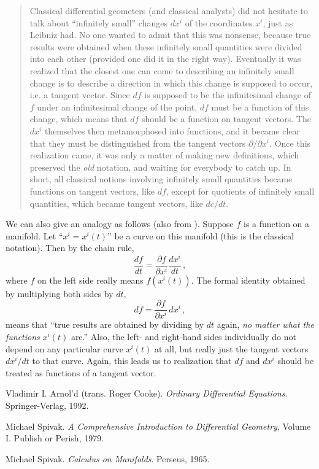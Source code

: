 \documentclass[12pt]{article}
\begin{document}
\begin{quote}
Classical differential geometers (and classical analysts)
did not hesitate to talk about ``infinitely small'' changes $dx^i$
of the coordinates $x^i$, just as Leibniz had.
No one wanted to admit that this was nonsense, because true
results were obtained when these infinitely small quantities
were divided into each other (provided one did it in the right way).
Eventually it was realized that the closest one can come to describing an
infinitely small change is to describe a direction in which this change
is supposed to occur, i.e. a tangent vector.  Since $df$ is supposed
to be the infinitesimal change of $f$ under an infinitesimal change
of the point, $df$ must be a function of this change,
which means that $df$ should be a function on tangent vectors.
The $dx^i$ themselves then metamorphosed into functions,
and it became clear that they must be distinguished from the tangent
vectors $\partial / \partial x^i$.
Once this realization came, it was only a matter of making new definitions,
which preserved the \emph{old} notation, and waiting for everybody
to catch up.  In short, all classical notions involving infinitely
small quantities became functions on tangent vectors, like $df$,
except for quotients of infinitely small
quantities, which became tangent vectors, like $dc/dt$.
\end{quote}

We can also give an analogy as follows (also from \cite{Spivak1}).  
Suppose $f$ is a 
function on a manifold.  Let ``$x^i = x^i(t)$'' be a 
curve on this manifold (this is the classical notation).
Then by the chain rule,
\[
\frac{df}{dt} = \frac{\partial f}{\partial x^i} \frac{d x^i}{dt}\,,
\]
where $f$ on the left side really means $f(x^i(t))$.
The formal identity obtained by multiplying both sides by $dt$,
\[
df = \frac{\partial f}{\partial x^i} \, dx^i\,,
\]
means that ``true results are obtained by dividing by $dt$ again,
\emph{no matter what the functions} $x^i(t)$ are.''
Also, the left- and right-hand sides individually
do not depend on any particular curve $x^i(t)$ at all, but
really just the tangent vectors $dx^i/dt$ to that curve.
Again, this leads us to realization that $df$
and $dx^i$ should be treated as functions of a tangent vector.


\begin{thebibliography}{3}
Vladimir I. Arnol'd (trans. Roger Cooke). 
{\it Ordinary Differential Equations}. Springer-Verlag, 1992.

Michael Spivak. \emph{A Comprehensive Introduction to Differential Geometry},
Volume I. Publish or Perish, 1979.

Michael Spivak. \emph{Calculus on Manifolds}. Perseus, 1965.
\end{thebibliography}
\end{document}

